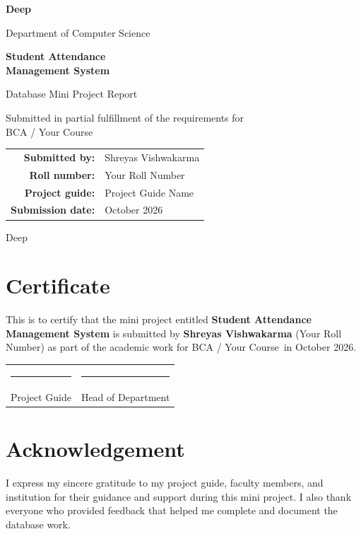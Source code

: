 \documentclass[12pt,a4paper]{report}
\newcommand{\studentname}{Shreyas Vishwakarma}
\newcommand{\studentroll}{Your Roll Number}
\newcommand{\coursename}{BCA / Your Course}
\newcommand{\departmentname}{Department of Computer Science}
\newcommand{\collegename}{Deep}
\newcommand{\guidename}{Project Guide Name}
\newcommand{\submissiondate}{October 2026}
\begin{document}
\begin{titlepage}
    \centering
    \vspace*{1.5cm}
    {\Large\bfseries \collegename\par}
    \vspace{0.4cm}
    {\large \departmentname\par}
    \vspace{2.0cm}
    {\Huge\bfseries Student Attendance\\[0.25em] Management System\par}
    \vspace{1.0cm}
    {\Large Database Mini Project Report\par}
    \vspace{1.7cm}
    {\large Submitted in partial fulfillment of the requirements for\\
    \coursename\par}
    \vspace{1.2cm}
    \begin{tabular}{>{\bfseries}rl}
        Submitted by: & \studentname \\
        Roll number: & \studentroll \\
        Project guide: & \guidename \\
        Submission date: & \submissiondate
    \end{tabular}
    \vfill
    {\large \collegename\par}
\end{titlepage}


\chapter*{Certificate}
This is to certify that the mini project entitled \textbf{Student Attendance Management System} is submitted by \textbf{\studentname} (\studentroll) as part of the academic work for \coursename\ in \submissiondate.

\vspace{2cm}
\begin{tabular*}{\textwidth}{@{\extracolsep{\fill}}ll}
    \rule{5cm}{0.4pt} & \rule{5cm}{0.4pt} \\
    Project Guide & Head of Department
\end{tabular*}

\chapter*{Acknowledgement}
I express my sincere gratitude to my project guide, faculty members, and institution for their guidance and support during this mini project. I also thank everyone who provided feedback that helped me complete and document the database work.
\end{document}
